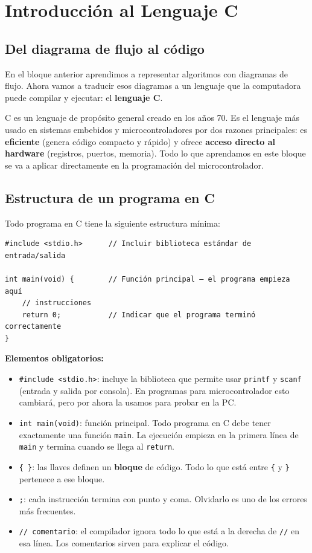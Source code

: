 \chapter{Introducción al Lenguaje C}

\section{Del diagrama de flujo al código}

En el bloque anterior aprendimos a representar algoritmos con diagramas de flujo. Ahora vamos a traducir esos diagramas a un lenguaje que la computadora puede compilar y ejecutar: el \textbf{lenguaje C}.

C es un lenguaje de propósito general creado en los años 70. Es el lenguaje más usado en sistemas embebidos y microcontroladores por dos razones principales: es \textbf{eficiente} (genera código compacto y rápido) y ofrece \textbf{acceso directo al hardware} (registros, puertos, memoria). Todo lo que aprendamos en este bloque se va a aplicar directamente en la programación del microcontrolador.

\section{Estructura de un programa en C}

Todo programa en C tiene la siguiente estructura mínima:

\begin{lstlisting}[style=estilo-c]
#include <stdio.h>      // Incluir biblioteca estándar de entrada/salida

int main(void) {        // Función principal — el programa empieza aquí
    // instrucciones
    return 0;           // Indicar que el programa terminó correctamente
}
\end{lstlisting}

\textbf{Elementos obligatorios:}

\begin{itemize}
    \item \texttt{\#include <stdio.h>}: incluye la biblioteca que permite usar \texttt{printf} y \texttt{scanf} (entrada y salida por consola). En programas para microcontrolador esto cambiará, pero por ahora la usamos para probar en la PC.
    \item \texttt{int main(void)}: función principal. Todo programa en C debe tener exactamente una función \texttt{main}. La ejecución empieza en la primera línea de \texttt{main} y termina cuando se llega al \texttt{return}.
    \item \texttt{\{ \}}: las llaves definen un \textbf{bloque} de código. Todo lo que está entre \texttt{\{} y \texttt{\}} pertenece a ese bloque.
    \item \texttt{;}: cada instrucción termina con punto y coma. Olvidarlo es uno de los errores más frecuentes.
    \item \texttt{// comentario}: el compilador ignora todo lo que está a la derecha de \texttt{//} en esa línea. Los comentarios sirven para explicar el código.
\end{itemize}

